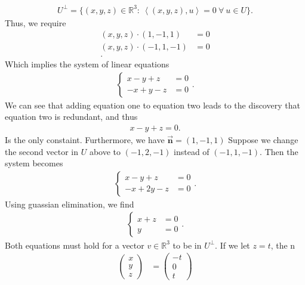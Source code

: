 \documentclass{report}
\begin{document}
\begin{itemize}
            \begin{align*}
                U^{\perp} = \{(x,y,z) \in \mathbb{R}^{3}:\ \left\langle (x,y,z), u\right\rangle = 0 \ \forall \ u \in U\}
            .\end{align*}
            Thus, we require
            \begin{align*}
                (x,y,z) \cdot  (1,-1,1) &= 0 \\
                (x,y,z) \cdot  (-1,1,-1) &= 0 \\
            .\end{align*}
            Which implies the system of linear equations
            \begin{align*}
               \begin{cases}
                   x -y + z &= 0 \\
                   -x + y - z &= 0
               \end{cases}
            .\end{align*}
            We can see that adding equation one to equation two leads to the discovery that equation two is redundant, and thus 
            \begin{align*}
                x -y + z = 0
            .\end{align*}
            Is the only constaint. Furthermore, we have $\vec{\mathbf{n}} = (1,-1,1)$
            \bigbreak \noindent 
            Suppose we change the second vector in $U$ above to $(-1,2,-1)$ instead of $(-1,1,-1)$. Then the system becomes
            \begin{align*}
                \begin{cases}
                    x -y  + z &= 0  \\
                    -x + 2y - z &= 0
                \end{cases}
            .\end{align*}
            Using guassian elimination, we find
            \begin{align*}
                \begin{cases}
                    x + z &=0 \\
                    y &= 0
                \end{cases}
            .\end{align*}
            Both equations must hold for a vector $v\in \mathbb{R}^{3}$ to be in $U^{\perp}$. If we let $z=t$, the n
            \begin{align*}
                \begin{pmatrix} x \\ y \\ z \end{pmatrix} &= \begin{pmatrix} -t \\ 0 \\ t\end{pmatrix} \\

\end{align*}
\end{itemize}
\end{document}
